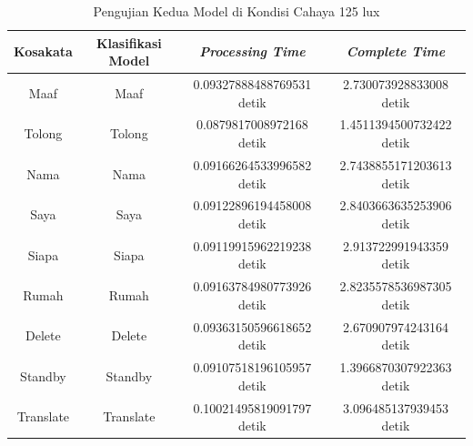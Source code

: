 \begin{longtable}{|c|c|c|c|}
  \caption{Pengujian Kedua Model di Kondisi Cahaya 125 lux}
  \label{tb:prediksiterang2}                                   \\
  \hline
  \rowcolor[HTML]{C0C0C0}
  \textbf{Kosakata} & \textbf{Klasifikasi Model} & \textbf{\emph{Processing Time}} & \textbf{\emph{Complete Time}}\\
  \hline
  Maaf              & Maaf                          & 0.09327888488769531 detik                           & 2.730073928833008 detik                                 \\
  Tolong            & Tolong                        & 0.0879817008972168 detik                            & 1.4511394500732422 detik                                  \\
  Nama              & Nama                          & 0.09166264533996582 detik                           & 2.7438855171203613 detik                                  \\
  Saya              & Saya                          & 0.09122896194458008 detik                           & 2.8403663635253906 detik                                  \\
  Siapa             & Siapa                         & 0.09119915962219238 detik                           & 2.913722991943359 detik                                 \\
  Rumah             & Rumah                         & 0.09163784980773926 detik                           & 2.8235578536987305 detik                                  \\
  Delete            & Delete                        & 0.09363150596618652 detik                           & 2.670907974243164 detik                                 \\
  Standby           & Standby                       & 0.09107518196105957 detik                           & 1.3966870307922363 detik                                  \\
  Translate         & Translate                     & 0.10021495819091797 detik                           & 3.096485137939453 detik                                 \\
  \hline
\end{longtable}

